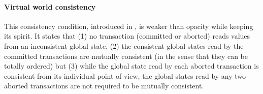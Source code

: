 \documentclass[runningheads,a4paper]{article}
\begin{document}


\paragraph{Virtual world consistency}
This consistency condition, introduced in \cite{IR09},  is 
weaker  than  opacity while  keeping  its spirit.  It  states  that (1)  no
transaction (committed or aborted)  reads values from an inconsistent global
state, (2)  the consistent global states read by the committed transactions 
are   mutually consistent (in the sense that they can be totally  ordered)  
but    (3)  while the  global  state read  by each aborted transaction  is
consistent from its individual point  of view, the  global states read by
any two aborted  transactions are not  required to be  mutually consistent.  

% 
\end{document}
